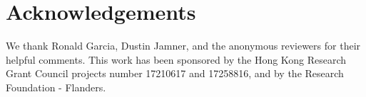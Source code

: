 \section*{Acknowledgements}

We thank Ronald Garcia, Dustin Jamner, and the anonymous reviewers for their
helpful comments. This work has been sponsored by the Hong Kong Research Grant
Council projects number 17210617 and 17258816, and by the Research Foundation -
Flanders.

